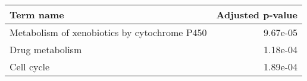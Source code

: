 \begin{tabular}{lr}
\toprule
                                   Term name &  Adjusted p-value \\
\midrule
Metabolism of xenobiotics by cytochrome P450 &          9.67e-05 \\
                             Drug metabolism &          1.18e-04 \\
                                  Cell cycle &          1.89e-04 \\
\bottomrule
\end{tabular}
